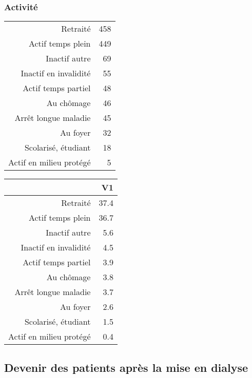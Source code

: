 \documentclass[11pt,a4paper]{article}\usepackage[]{graphicx}\usepackage[]{color}
\begin{document}
    \subsubsection{Activité}

\begin{table}[ht]
\centering
\begin{tabular}{rr}
  \hline
  \hline
Retraité & 458 \\ 
  Actif temps plein & 449 \\ 
  Inactif autre &  69 \\ 
  Inactif en invalidité &  55 \\ 
  Actif temps partiel &  48 \\ 
  Au chômage &  46 \\ 
  Arrêt longue maladie &  45 \\ 
  Au foyer &  32 \\ 
  Scolarisé, étudiant &  18 \\ 
  Actif en milieu protégé &   5 \\ 
   \hline
\end{tabular}
\end{table}
\begin{table}[ht]
\centering
\begin{tabular}{rr}
  \hline
 & V1 \\ 
  \hline
Retraité & 37.4 \\ 
  Actif temps plein & 36.7 \\ 
  Inactif autre & 5.6 \\ 
  Inactif en invalidité & 4.5 \\ 
  Actif temps partiel & 3.9 \\ 
  Au chômage & 3.8 \\ 
  Arrêt longue maladie & 3.7 \\ 
  Au foyer & 2.6 \\ 
  Scolarisé, étudiant & 1.5 \\ 
  Actif en milieu protégé & 0.4 \\ 
   \hline
\end{tabular}
\end{table}


  \subsection{Devenir des patients après la mise en dialyse}
  
\end{document}
